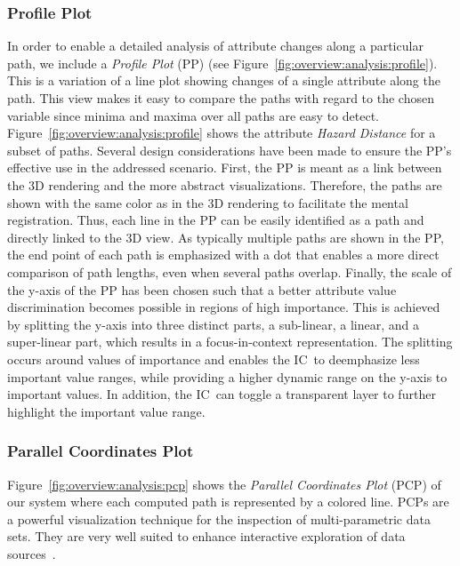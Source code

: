 \documentclass[conference,10pt,letter]{IEEEtran}
\def\IC{IC}
\begin{document}
\subsubsection{Profile Plot} \label{sec:overview:analysis:profile}
In order to enable a detailed analysis of attribute changes along a particular path, we include a \emph{Profile Plot} (PP) (see Figure~\ref{fig:overview:analysis:profile}). This is a variation of a line plot showing changes of a single attribute along the path. This view makes it easy to compare the paths with regard to the chosen variable since minima and maxima over all paths are easy to detect. Figure~\ref{fig:overview:analysis:profile} shows the attribute \emph{Hazard Distance} for a subset of paths. Several design considerations have been made to ensure the PP's effective use in the addressed scenario. First, the PP is meant as a link between the 3D rendering and the more abstract visualizations. Therefore, the paths are shown with the same color as in the 3D rendering to facilitate the mental registration. Thus, each line in the PP can be easily identified as a path and directly linked to the 3D view. As typically multiple paths are shown in the PP, the end point of each path is emphasized with a dot that enables a more direct comparison of path lengths, even when several paths overlap. Finally, the scale of the y-axis of the PP has been chosen such that a better attribute value discrimination becomes possible in regions of high importance. This is achieved by splitting the y-axis into three distinct parts, a sub-linear, a linear, and a super-linear part, which results in a focus-in-context representation. The splitting occurs around values of importance and enables the \IC\ to deemphasize less important value ranges, while providing a higher dynamic range on the y-axis to important values. In addition, the \IC\ can toggle a transparent layer to further highlight the important value range.

\subsubsection{Parallel Coordinates Plot} \label{sec:overview:analysis:pcp}
Figure~\ref{fig:overview:analysis:pcp} shows the \emph{Parallel Coordinates Plot} (PCP) of our system where each computed path is represented by a colored line. PCPs are a powerful visualization technique for the inspection of multi-parametric data sets. They are very well suited to enhance interactive exploration of data sources~\cite{Tory05aparallel}.
\end{document}
